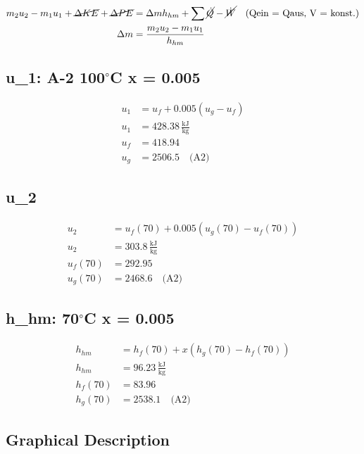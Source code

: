 \begin{align*}
m_2 u_2 - m_1 u_1 + \cancel{\Delta KE} + \cancel{\Delta PE} &= \Delta m h_{hm} + \sum \cancel{\dot{Q}} - \cancel{\dot{W}} \quad \text{(Qein = Qaus, V = konst.)} \\
\Delta m &= \frac{m_2 u_2 - m_1 u_1}{h_{hm}}
\end{align*}

\subsection*{u_1: A-2 100$^\circ$C x = 0.005}

\begin{align*}
u_1 &= u_f + 0.005 \left( u_g - u_f \right) \\
u_1 &= 428.38 \, \frac{\text{kJ}}{\text{kg}} \\
u_f &= 418.94 \\
u_g &= 2506.5 \quad \text{(A2)}
\end{align*}

\subsection*{u_2}

\begin{align*}
u_2 &= u_f (70) + 0.005 \left( u_g (70) - u_f (70) \right) \\
u_2 &= 303.8 \, \frac{\text{kJ}}{\text{kg}} \\
u_f (70) &= 292.95 \\
u_g (70) &= 2468.6 \quad \text{(A2)}
\end{align*}

\subsection*{h_{hm}: 70$^\circ$C x = 0.005}

\begin{align*}
h_{hm} &= h_f (70) + x \left( h_g (70) - h_f (70) \right) \\
h_{hm} &= 96.23 \, \frac{\text{kJ}}{\text{kg}} \\
h_f (70) &= 83.96 \\
h_g (70) &= 2538.1 \quad \text{(A2)}
\end{align*}

\subsection*{Graphical Description}


